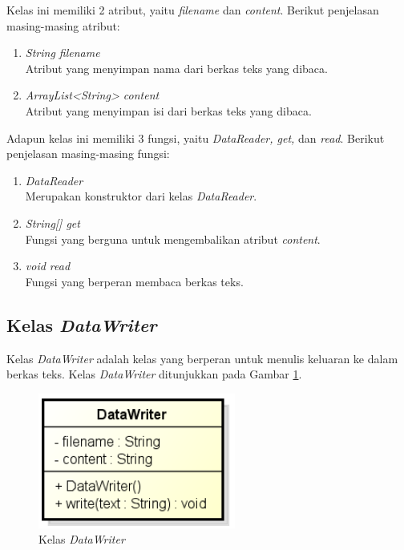 Kelas ini memiliki 2 atribut, yaitu \textit{filename} dan \textit{content}. Berikut penjelasan masing-masing atribut:

\begin{enumerate}
	\item \textit{String filename} \\
	Atribut yang menyimpan nama dari berkas teks yang dibaca.
	\item \textit{ArrayList<String> content} \\
	Atribut yang menyimpan isi dari berkas teks yang dibaca.
\end{enumerate}

Adapun kelas ini memiliki 3 fungsi, yaitu \textit{DataReader, get,} dan \textit{read}. Berikut penjelasan masing-masing fungsi:

\begin{enumerate}
	\item \textit{DataReader} \\
	Merupakan konstruktor dari kelas \textit{DataReader}.
	\item \textit{String[] get} \\
	Fungsi yang berguna untuk mengembalikan atribut \textit{content}.
	\item \textit{void read} \\
	Fungsi yang berperan membaca berkas teks.
\end{enumerate}

\subsection{Kelas \textit{DataWriter}}

Kelas \textit{DataWriter} adalah kelas yang berperan untuk menulis keluaran ke dalam berkas teks. Kelas \textit{DataWriter} ditunjukkan pada Gambar \ref{fig:classdatawriter}.

\begin{figure}[H]
	\centering
	\includegraphics[scale=0.8]{Gambar/class_data_writer}
	\caption{Kelas \textit{DataWriter}}\label{fig:classdatawriter}
\end{figure}

